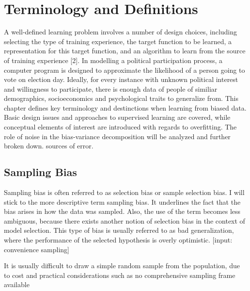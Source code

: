 \section{Terminology and Definitions}

A well-defined learning problem involves a number of design choices, including selecting the type of training experience, the target function to be learned, a representation for this target function, and an algorithm to learn from the source of training experience [2]. In modelling a political participation process, a computer program is designed to approximate the likelihood of a person going to vote on election day. Ideally, for every instance with unknown political interest and willingness to participate, there is enough data of people of similiar demographics, socioeconomics and psychological traits to generalize from. This chapter defines key terminology and destinctions when learning from biased data. Basic design issues and approaches to supervised learning are covered, while conceptual elements of interest are introduced with regards to overfitting. The role of noise in the bias-variance decomposition will be analyzed and further broken down. sources of error.

\subsection{Sampling Bias}

Sampling bias is often referred to as selection bias or sample selection bias. I will stick to the more descriptive term sampling bias. It underlines the fact that the bias arises in how the data was sampled. Also, the use of the term becomes less ambiguous, because there exists another notion of selection bias in the context of model selection. This type of bias is usually referred to as bad generalization, where the performance of the selected hypothesis is overly optimistic. [input: convenience sampling]

It is usually difficult to draw a simple random sample from the population, due to cost and practical considerations such as no comprehensive sampling frame available

